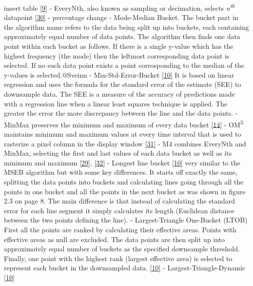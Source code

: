 \documentclass{article}
\begin{document}
insert table \protect\hyperlink{ref-datapoint}{{[}9{]}} - EveryNth, also
known as sampling or decimation, selects \emph{n\textsuperscript{th}}
datapoint \protect\hyperlink{ref-EveryNth}{{[}30{]}} - percentage change
- Mode-Median Bucket. The bucket part in the algorithm name refers to
the data being split up into buckets, each containing approximately
equal number of data points. The algorithm then finds one data point
within each bucket as follows. If there is a single y-value which has
the highest frequency (the mode) then the leftmost corresponding data
point is selected. If no such data point exists a point corrosponding to
the median of the y-values is selected.@Sveinn - Min-Std-Error-Bucket
\protect\hyperlink{ref-Sveinn}{{[}10{]}} It is based on linear
regression and uses the formula for the standard error of the estimate
(SEE) to downsample data. The SEE is a measure of the accuracy of
predictions made with a regression line when a linear least squares
technique is applied. The greater the error the more discrepancy between
the line and the data points. - MinMax preserves the minimum and maximum
of every data bucket \protect\hyperlink{ref-MinMaxLTTB}{{[}14{]}} -
OM\textsuperscript{3} maintains minimum and maximum values at every time
interval that is used to rasterize a pixel column in the display window
\protect\hyperlink{ref-MinMaxOrdered}{{[}31{]}} - M4 combines EveryNth
and MinMax, selecting the first and last values of each data bucket as
well as its minimum and maximum
\protect\hyperlink{ref-dashql}{{[}29{]}},
\protect\hyperlink{ref-M4}{{[}32{]}} - Longest line bucket
\protect\hyperlink{ref-Sveinn}{{[}10{]}} very similar to the MSEB
algorithm but with some key differences. It starts off exactly the same,
splitting the data points into buckets and calculating lines going
through all the points in one bucket and all the points in the next
bucket as was shown in figure 2.3 on page 8. The main difference is that
instead of calculating the standard error for each line segment it
simply calculates its length (Euclidean distance between the two points
defining the line). - Largest-Triangle One-Bucket (LTOB) First all the
points are ranked by calculating their effective areas. Points with
effective areas as null are excluded. The data points are then split up
into approximately equal number of buckets as the specified downsample
threshold. Finally, one point with the highest rank (largest effective
area) is selected to represent each bucket in the downsampled data.
\protect\hyperlink{ref-Sveinn}{{[}10{]}} - Largest-Triangle-Dynamic
\protect\hyperlink{ref-Sveinn}{{[}10{]}}
\end{document}
